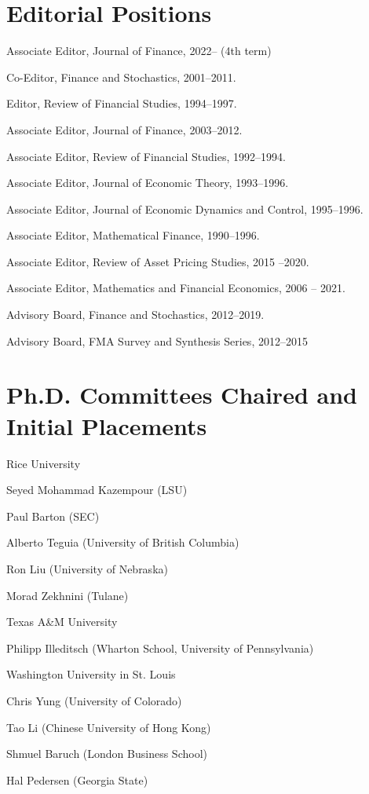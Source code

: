\documentclass[margin, 11pt]{res}
\newenvironment{list1}{
  \begin{list}{}{%
            \setlength{\itemsep}{0in}
      \setlength{\parsep}{0in} \setlength{\parskip}{0in}
      \setlength{\topsep}{0in} \setlength{\partopsep}{0in}
      \setlength{\leftmargin}{0.2in}}}{\end{list}}
\newenvironment{list3}{
  \begin{list}{}{%
            \setlength{\itemsep}{0in}
      \setlength{\parsep}{0in} \setlength{\parskip}{0in}
      \setlength{\topsep}{0in} \setlength{\partopsep}{0in}
      \setlength{\leftmargin}{0.2in}}}{\vspace*{.15in}\end{list}}
\begin{document}
\begin{resume}
\section{\sc Editorial Positions}
\begin{list1}
\item Associate Editor, Journal of Finance, 2022-- (4th term)
\item Co-Editor, Finance and Stochastics, 2001--2011.
\item Editor, Review of Financial Studies, 1994--1997.
\item Associate Editor, Journal of Finance, 2003--2012.
\item Associate Editor, Review of Financial Studies, 1992--1994.
\item Associate Editor, Journal of Economic Theory, 1993--1996.
\item Associate Editor, Journal of Economic Dynamics and Control,
1995--1996.
\item Associate Editor, Mathematical Finance, 1990--1996.
\item Associate Editor, Review of Asset Pricing Studies, 2015 --2020.
\item Associate Editor, Mathematics and Financial Economics, 2006 -- 2021.
\item Advisory Board, Finance and Stochastics, 2012--2019.
\item Advisory Board, FMA Survey and Synthesis Series, 2012--2015
\end{list1}

\section{\sc Ph.D. Committees Chaired and Initial Placements}
\begin{list1}
\item Rice University
\begin{list3}
\item Seyed Mohammad Kazempour (LSU)
\item Paul Barton (SEC)
\item  Alberto Teguia (University of British Columbia)
\item Ron Liu (University of Nebraska)
\item   Morad Zekhnini (Tulane)


\end{list3}
   \item Texas A\&M University
\begin{list3}
\item   Philipp Illeditsch (Wharton School, University of Pennsylvania)
\end{list3}
 \item Washington University in St. Louis
\begin{list3}
\item  Chris Yung (University of Colorado)
\item  Tao Li (Chinese University of Hong Kong)
\item    Shmuel Baruch (London Business School)
\item Hal Pedersen (Georgia State)


\end{list3}
\end{list1}
\end{resume}
\end{document}
